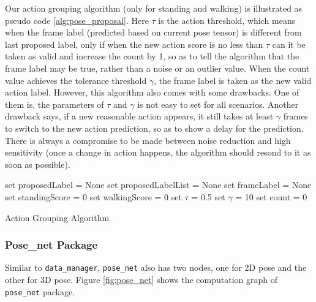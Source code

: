 Our action grouping algorithm (only for standing and walking) is illustrated as pseudo code \ref{alg:pose_proposal}. Here $\tau$ is the action threshold, which means when the frame label (predicted based on current pose tensor) is different from last proposed label, only if when the new action score is no less than $\tau$ can it be taken as valid and increase the count by 1, so as to tell the algorithm that the frame label may be true, rather than a noise or an outlier value. When the count value achieves the tolerance threshold $\gamma$, the frame label is taken as the new valid action label. However, this algorithm also comes with some drawbacks. One of them is, the parameters of $\tau$ and $\gamma$ is not easy to set for all scenarios. Another drawback says, if a new reasonable action appears, it still takes at least $\gamma$ frames to switch to the new action prediction, so as to show a delay for the prediction. There is always a compromise to be made between noise reduction and high sensitivity (once a change in action happens, the algorithm should resond to it as soon as possible).    
\begin{algorithm}[h!]
\SetAlgoLined
{} 
set proposedLabel = None\;
set proposedLabelList = None\;
set frameLabel = None\;
set standingScore = 0\;
set walkingScore = 0\;
set $\tau$ = 0.5\;
set $\gamma$ = 10\;
set count = 0\;  
\caption{Action Grouping Algorithm}
\label{alg:pose_proposal}
\end{algorithm}      

\subsubsection{Pose\_net Package}

Similar to \texttt{data\_manager}, \texttt{pose\_net} also has two nodes, one for 2D pose and the other for 3D pose. Figure \ref{fig:pose_net} shows the computation graph of \texttt{pose\_net} package. 

